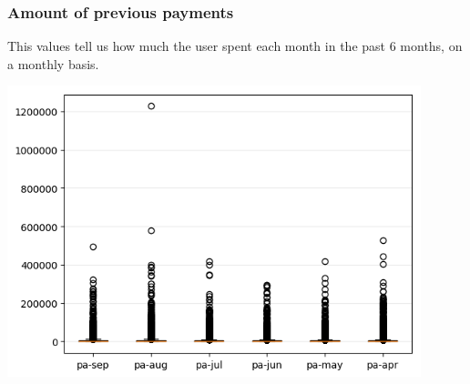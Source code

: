 \documentclass[a4paper]{article}
\begin{document}
\subsubsection{Amount of previous payments}
This values tell us how much the user spent each month in the past 6 months, on a monthly basis.
\begin{center}
\includegraphics[width=0.9\textwidth]{../Code/boxPlotsGemma/boxplots/pa.png}
\end{center}
\end{document}
